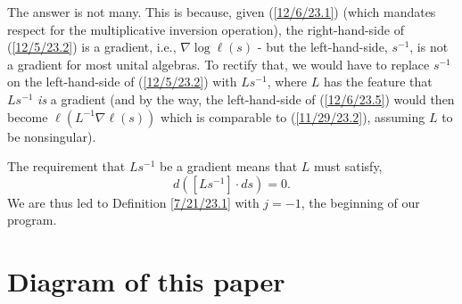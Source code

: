 \documentclass{amsart}
\numberwithin{equation}{section}
\theoremstyle{definition}
\numberwithin{theorem}{section}
\begin{document}
The answer is not many.  This is because, given (\ref{12/6/23.1}) (which mandates respect for the multiplicative inversion operation), the right-hand-side of (\ref{12/5/23.2}) is a gradient, i.e., $\nabla\log \ell(s)$ - but the left-hand-side, $s^{-1}$,  is not a gradient for most unital algebras.  
To rectify that, we would have to replace $s^{-1}$ on the left-hand-side of (\ref{12/5/23.2}) with $Ls^{-1}$, where $L$ has the feature that $Ls^{-1}$ {\it is} a gradient (and by the way, the left-hand-side of (\ref{12/6/23.5}) would then become $\ell(L^{-1}\nabla\ell(s))$ which is comparable to (\ref{11/29/23.2}), assuming $L$ to be nonsingular).   


The requirement that $Ls^{-1}$ be a gradient means that $L$ must satisfy, \[ d([Ls^{-1}]\cdot ds) = 0.\]  We are thus led to Definition \ref{7/21/23.1} with $j=-1$, the beginning of our program.

\newpage



\section{Diagram of this paper}

\vspace{.5cm}
 
\end{document}
